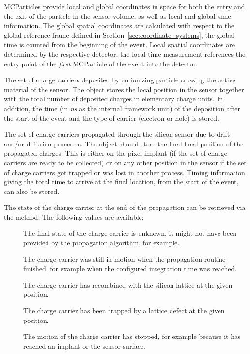 MCParticles provide local and global coordinates in space for both the entry and the exit of the particle in the sensor volume, as well as local and global time information.
The global spatial coordinates are calculated with respect to the global reference frame defined in Section~\ref{sec:coordinate_systems}, the global time is counted from the beginning of the event.
Local spatial coordinates are determined by the respective detector, the local time measurement references the entry point of the \emph{first} MCParticle of the event into the detector.

The set of charge carriers deposited by an ionizing particle crossing the active material of the sensor.
The object stores the \underline{local} position in the sensor together with the total number of deposited charges in elementary charge units.
In addition, the time (in \textit{ns} as the internal framework unit) of the deposition after the start of the event and the type of carrier (electron or hole) is stored.

The set of charge carriers propagated through the silicon sensor due to drift and/or diffusion processes.
The object should store the final \underline{local} position of the propagated charges.
This is either on the pixel implant (if the set of charge carriers are ready to be collected) or on any other position in the sensor if the set of charge carriers got trapped or was lost in another process.
Timing information giving the total time to arrive at the final location, from the start of the event, can also be stored.

The state of the charge carrier at the end of the propagation can be retrieved via the  method. The following values are available:

\begin{description}
\item[] The final state of the charge carrier is unknown, it might not have been provided by the propagation algorithm, for example.
\item[] The charge carrier was still in motion when the propagation routine finished, for example when the configured integration time was reached.
\item[] The charge carrier has recombined with the silicon lattice at the given position.
\item[] The charge carrier has been trapped by a lattice defect at the given position.
\item[] The motion of the charge carrier has stopped, for example because it has reached an implant or the sensor surface.
\end{description}

